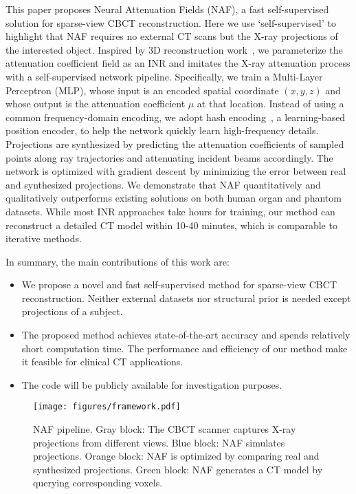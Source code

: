 \documentclass[runningheads]{llncs}
\begin{document}
This paper proposes Neural Attenuation Fields (NAF), a fast self-supervised solution for sparse-view CBCT reconstruction. Here we use `self-supervised' to highlight that NAF requires no external CT scans but the X-ray projections of the interested object. Inspired by 3D reconstruction work~\cite{mildenhall2020nerf,park2019deepsdf}, we parameterize the attenuation coefficient field as an INR and imitates the X-ray attenuation process with a self-supervised network pipeline. Specifically, we train a Multi-Layer Perceptron (MLP), whose input is an encoded spatial coordinate $(x,y,z)$ and whose output is the attenuation coefficient $\mu$ at that location. Instead of using a common frequency-domain encoding, we adopt hash encoding~\cite{mueller2022instant}, a learning-based position encoder, to help the network quickly learn high-frequency details. Projections are synthesized by predicting the attenuation coefficients of sampled points along ray trajectories and attenuating incident beams accordingly. The network is optimized with gradient descent by minimizing the error between real and synthesized projections. We demonstrate that NAF quantitatively and qualitatively outperforms existing solutions on both human organ and phantom datasets. While most INR approaches take hours for training, our method can reconstruct a detailed CT model within 10-40 minutes, which is comparable to iterative methods.

In summary, the main contributions of this work are:
\begin{itemize}
    \item We propose a novel and fast self-supervised method for sparse-view CBCT reconstruction. Neither external datasets nor structural prior is needed except projections of a subject.
    \item The proposed method achieves state-of-the-art accuracy and spends relatively short computation time. The performance and efficiency of our method make it feasible for clinical CT applications.
    \item The code will be publicly available for investigation purposes.
\end{itemize}

\begin{figure}[!b]
\centering
    \texttt{[image: figures/framework.pdf]}
    \caption{
NAF pipeline. Gray block: The CBCT scanner captures X-ray projections from different views. Blue block: NAF simulates projections. Orange block: NAF is optimized by comparing real and synthesized projections. Green block: NAF generates a CT model by querying corresponding voxels.}
    \label{fig:framework}
\end{figure}
\end{document}
